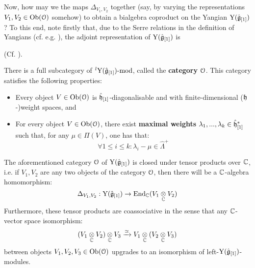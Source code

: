         Now, how may we  the maps $\Delta_{V_1, V_2}$ together (say, by varying the representations $V_1, V_2 \in \mathrm{Ob}(\mathcal{O})$ somehow) to obtain a bialgebra coproduct on the Yangian $\mathrm{Y}(\hat{\mathfrak{g}}_{[1]})$ ? To this end, note firstly that, due to the Serre relations in the definition of Yangians (cf. e.g. \cite[Equation 2.7]{guay_nakajima_wendlandt_affine_yangian_coproduct}), the adjoint representation of $\mathrm{Y}(\hat{\mathfrak{g}}_{[1]})$ is  
        
        \begin{lemma} \label{lemma: category_O_affine_yangian}
            (Cf. \cite[Theorem 4.9]{guay_nakajima_wendlandt_affine_yangian_coproduct}).
        
            There is a full subcategory of ${}^l\mathrm{Y}(\hat{\mathfrak{g}}_{[1]})\text{-}\mathrm{mod}$, called the \textbf{category $\mathcal{O}$}. This category satisfies the following properties:
            \begin{itemize}
                \item Every object $V \in \mathrm{Ob}(\mathcal{O})$ is $\hat{\mathfrak{h}}_{[1]}$-diagonalisable and with finite-dimensional ($\mathfrak{h}$-)weight spaces, and
                \item For every object $V \in \mathrm{Ob}(\mathcal{O})$, there exist \textbf{maximal weights} $\lambda_1, ..., \lambda_k \in \hat{\mathfrak{h}}_{[1]}^*$ such that, for any $\mu \in \Pi(V)$, one has that:
                    $$\forall 1 \leq i \leq k: \lambda_i - \mu \in \hat{\Lambda}^+$$
            \end{itemize}

            The aforementioned category $\mathcal{O}$ of $\mathrm{Y}(\hat{\mathfrak{g}}_{[1]})$ is closed under tensor products over $\mathbb{C}$, i.e. if $V_1, V_2$ are any two objects of the category $\mathcal{O}$, then there will be a $\mathbb{C}$-algebra homomorphism:
                $$\Delta_{V_1, V_2}: \rmY(\hat{\g}_{[1]}) \to \End_{\bbC}(V_1 \tensor_{\bbC} V_2)$$
            Furthermore, these tensor products are coassociative in the sense that any $\mathbb{C}$-vector space isomorphism:
                $$(V_1 \tensor_{\bbC} V_2) \tensor_{\bbC} V_3 \xrightarrow[]{\cong} V_1 \tensor_{\bbC} (V_2 \tensor_{\bbC} V_3)$$
            between objects $V_1, V_2, V_3 \in \mathrm{Ob}(\mathcal{O})$ upgrades to an isomorphism of left-$\mathrm{Y}(\hat{\mathfrak{g}}_{[1]})$-modules.


\end{lemma}
